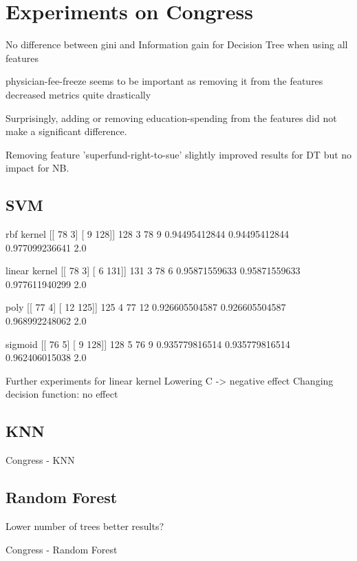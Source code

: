 \section{Experiments on Congress}
No difference between gini and Information gain for Decision Tree when using all features

physician-fee-freeze seems to be important as removing it from the features decreased metrics quite drastically

Surprisingly, adding or removing education-spending from the features did not make a significant difference.

Removing feature 'superfund-right-to-sue' slightly improved results for DT but no impact for NB.

\subsection{SVM}

rbf kernel
[[ 78   3]
 [  9 128]]
128 3 78 9
0.94495412844 0.94495412844 0.977099236641 2.0

linear kernel
[[ 78   3]
 [  6 131]]
131 3 78 6
0.95871559633 0.95871559633 0.977611940299 2.0

poly
[[ 77   4]
 [ 12 125]]
125 4 77 12
0.926605504587 0.926605504587 0.968992248062 2.0

sigmoid
[[ 76   5]
 [  9 128]]
128 5 76 9
0.935779816514 0.935779816514 0.962406015038 2.0

Further experiments for linear kernel
Lowering C -> negative effect
Changing decision function: no effect

\subsection{KNN}
\begin{table}[tb]
\centering

\caption{Congress - KNN}
\end{table}

\subsection{Random Forest}
Lower number of trees better results?
\begin{table}[tb]
\centering

\caption{Congress - Random Forest}
\end{table}
